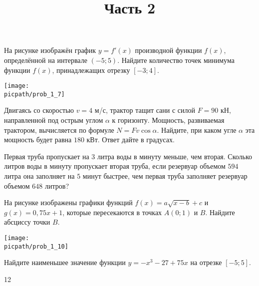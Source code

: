 \begin{training}[1]
\begin{listofex}[resume]
		\foranswer
		\item
		На рисунке изображён график \( y = f'(x) \)
		производной функции \( f(x) \),
		определённой на интервале \( (-5; 5) \).
		Найдите количество точек минимума функции \( f(x) \),
		принадлежащих отрезку \( [-3; 4] \).
		\begin{center}
			\texttt{[image: \\picpath/prob\_1\_7]}
		\end{center}
		\foranswer
		\item Двигаясь со скоростью \( v = 4 \) м/с, трактор тащит сани с силой \( F = 90 \) кН,
		направленной под острым углом \( \alpha \) к горизонту.
		Мощность, развиваемая трактором, вычисляется по формуле \( N = F v \cos \alpha \).
		Найдите, при каком угле \( \alpha \) эта мощность будет равна \( 180 \) кВт.
		Ответ дайте в градусах.
		\foranswer
		\item Первая труба пропускает на \( 3 \) литра воды в минуту меньше,
		чем вторая. Сколько литров воды в минуту пропускает вторая труба,
		если резервуар объемом \( 594 \) литра она заполняет на \( 5 \) минут быстрее,
		чем первая труба заполняет резервуар объемом \( 648 \) литров?
		\foranswer
		\newpage
		\hphantom{Часть 1}
		\item 
		На рисунке изображены графики функций \( f(x) = a\sqrt{x-b}+c \) и \( g(x) = 0,75x+1 \),
		которые пересекаются в точках \( A(0;1) \) и \( B \). Найдите абсциссу точки \( B \).
		\begin{center}
			\texttt{[image: \\picpath/prob\_1\_10]}
		\end{center}
		\foranswer
		\item Найдите наименьшее значение функции \( y=-x^3-27+75x \) на отрезке \( [-5;5] \).
		\foranswer
		\egepreambtwo
		\title{Часть 2}
		\item 12
	\end{listofex}
\end{training}

